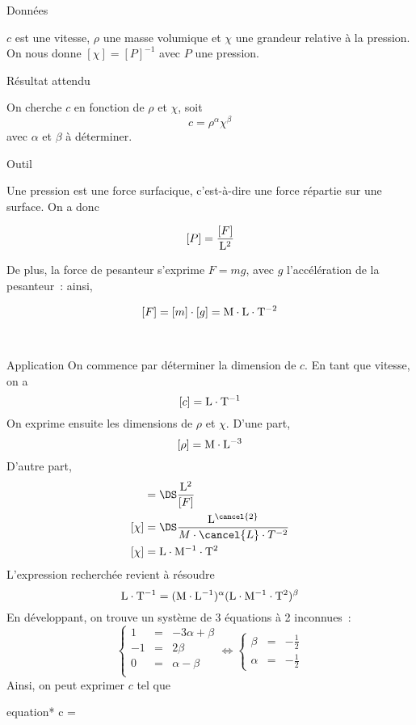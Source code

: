 \documentclass[../main/main.tex]{subfiles}
\begin{document}
\begin{tcbraster}[raster columns=3, raster equal height=rows]
	\begin{NCdefi}[]{Données}

		$c$ est une vitesse, $\rho$ une masse volumique et $\chi$ une grandeur
		relative à la pression. On nous donne $[\chi] = [P]^{-1}$ avec $P$ une
		pression.

	\end{NCdefi}
	\begin{NCprop}[]{Résultat attendu}

		On cherche $c$ en fonction de $\rho$ et $\chi$, soit
		\[\boxed{c = \rho^\alpha\chi^\beta}\]
		avec $\alpha$ et $\beta$ à déterminer.

	\end{NCprop}
	\begin{NCrapp}[]{Outil}

		Une pression est une force surfacique, c'est-à-dire une force répartie
		sur une surface. On a donc

		\[[P] = \frac{[F]}{\rm L^2}\]

		De plus, la force de pesanteur s'exprime $F = mg$, avec $g$
		l'accélération de la pesanteur~: ainsi,

		\[[F] = [m]\cdot [g] = \rm M\cdot L\cdot T^{-2}\]
	\end{NCrapp}
\end{tcbraster}
~
\begin{NCexem}[sidebyside]{Application}
	On commence par déterminer la dimension de $c$. En tant que vitesse, on a
	\[[c] = \rm L\cdot T^{-1}\]
	On exprime ensuite les dimensions de $\rho$ et $\chi$. D'une part,
	\[[\rho] = \rm M\cdot L^{-3}\]
	D'autre part,
	\begin{align*}
		[\chi] & = \DS\frac{\rm L^2}{[F]}                                      \\
		[\chi] & = \DS\frac{\rm L^{\cancel{2}}}{M\cdot \cancel{L}\cdot T^{-2}} \\
		[\chi] & = \rm L\cdot M^{-1}\cdot T^2                                  \\
	\end{align*}
	\tcblower
	L'expression recherchée revient à résoudre
	\[\rm L\cdot T^{-1} = (M\cdot L^{-1})^\alpha(L\cdot M^{-1}\cdot T^2)^\beta\]
	En développant, on trouve un système de 3 équations à 2 inconnues~:
	\[ \left\{
		\begin{array}{rcl}
			1  & = & -3\alpha + \beta \\
			-1 & = & 2\beta           \\
			0  & = & \alpha - \beta   \\
		\end{array}
		\right. \Longleftrightarrow \left\{
		\begin{array}{rcl}
			\beta  & = & - \frac{1}{2} \\
			\alpha & = & - \frac{1}{2}
		\end{array}
		\right.\]
	Ainsi, on peut exprimer $c$ tel que
	\begin{empheq}[box=\fbox]{equation*}
		c = 
	\end{empheq}
\end{NCexem}
\end{document}
